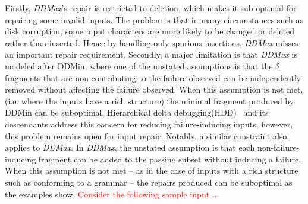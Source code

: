 \documentclass[sigconf,review,anonymous]{acmart}
\newcounter{todocounter}
\newcommand{\todo}[1]{\marginpar{$|$}\textcolor{red}{\stepcounter{todocounter}\footnote[\thetodocounter]{\textcolor{red}{\textbf{TODO }}\textit{#1}}}}
\newcommand{\recheck}[1]{\textcolor{red}{#1}}
\renewcommand{\todo}[1]{}
\newcommand{\ddmin}{\textit{ddmin}\xspace}
\def\ddmin{DDMin\xspace}
\newcommand{\ddmax}{\textit{DDMax}\xspace}
\newcommand{\brepair}{\textit{BRepair}\xspace}
\begin{document}




\todo{reduce further .. and add example}
Firstly, \ddmax's repair is restricted to deletion, which makes it sub-optimal for repairing some invalid inputs. The problem is that in many circumstances such as
disk corruption, some input characters are more likely to be changed or deleted
rather than inserted. Hence by handling only spurious insertions, \ddmax misses
an important repair requirement. Secondly, 
a major limitation is that \ddmax is modeled after \ddmin, where one of
the unstated assumptions is that the $\delta$ fragments that are non
contributing to the failure observed can be independently removed without
affecting the failure observed. When this assumption is not met, (i.e. where
the inputs have a rich structure) the minimal fragment produced by \ddmin
can be suboptimal. %
Hierarchical delta debugging(HDD)~\cite{misherghi2006hdd}
and its descendants address this concern for reducing failure-inducing inputs, however, this problem remains open for input repair. Notably, a similar constraint also applies to \ddmax. In \ddmax,
the unstated assumption is that each non-failure-inducing fragment
can be added to the passing subset without inducing a failure. When this
assumption is not met -- as in the case of inputs with a rich structure such as
conforming to a grammar -- the repairs produced can be suboptimal as the
examples show. 
\recheck{
Consider the following sample input ...\todo{we need to decide the most important limitation to buttress with an example here ... I think one that requires insertion and incompleteness error-feedback is the most important differentiator, or a hybrid example that also contains multiple faults ... } \todo{it should also be the same example to motivate and illustrate the way \brepair works (after the par. )}
}
\end{document}
